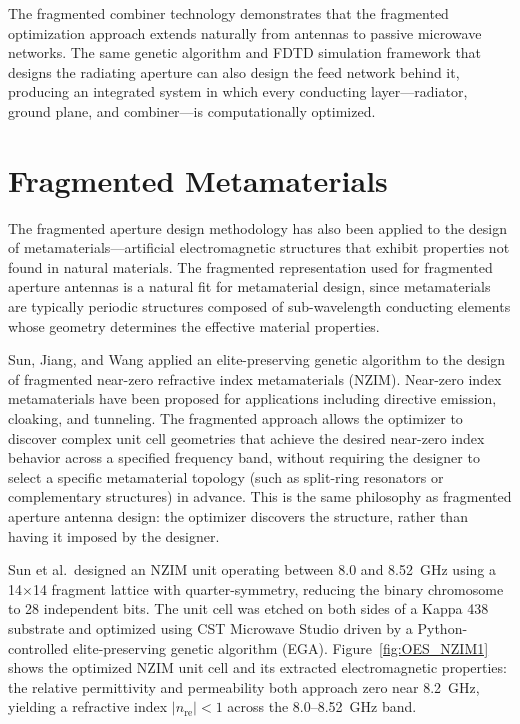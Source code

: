 The fragmented combiner technology demonstrates that the fragmented optimization approach extends naturally from antennas to passive microwave networks.  The same genetic algorithm and FDTD simulation framework that designs the radiating aperture can also design the feed network behind it, producing an integrated system in which every conducting layer---radiator, ground plane, and combiner---is computationally optimized.


\section{Fragmented Metamaterials}
\label{sec:metamaterials}

The fragmented aperture design methodology has also been applied to the design of metamaterials---artificial electromagnetic structures that exhibit properties not found in natural materials.  The fragmented representation used for fragmented aperture antennas is a natural fit for metamaterial design, since metamaterials are typically periodic structures composed of sub-wavelength conducting elements whose geometry determines the effective material properties.

Sun, Jiang, and Wang \cite{Sun2023PixelatedNZIM} applied an elite-preserving genetic algorithm to the design of fragmented near-zero refractive index metamaterials (NZIM).  Near-zero index metamaterials have been proposed for applications including directive emission, cloaking, and tunneling.  The fragmented approach allows the optimizer to discover complex unit cell geometries that achieve the desired near-zero index behavior across a specified frequency band, without requiring the designer to select a specific metamaterial topology (such as split-ring resonators or complementary structures) in advance.  This is the same philosophy as fragmented aperture antenna design: the optimizer discovers the structure, rather than having it imposed by the designer.

Sun et al.\ designed an NZIM unit operating between 8.0 and 8.52~GHz using a 14$\times$14 fragment lattice with quarter-symmetry, reducing the binary chromosome to 28 independent bits.  The unit cell was etched on both sides of a Kappa 438 substrate and optimized using CST Microwave Studio driven by a Python-controlled elite-preserving genetic algorithm (EGA).  Figure~\ref{fig:OES_NZIM1} shows the optimized NZIM unit cell and its extracted electromagnetic properties: the relative permittivity and permeability both approach zero near 8.2~GHz, yielding a refractive index $|n_{\mathrm{re}}| < 1$ across the 8.0--8.52~GHz band.

